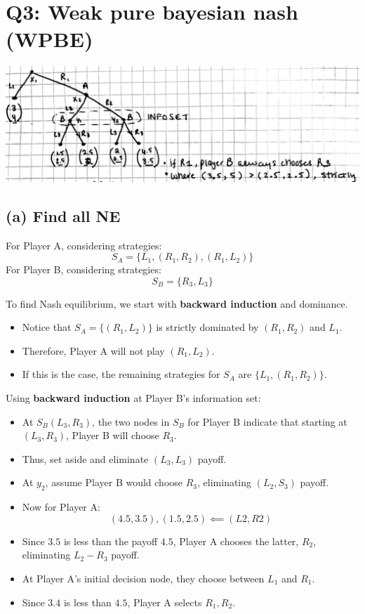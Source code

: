\documentclass{article}
\begin{document}
\section*{Q3: Weak pure bayesian nash (WPBE)}


\begin{center}
 \includegraphics[width=.75\linewidth]{images/Screenshot 2025-03-02 at 19.20.19.png} 
\end{center}


\subsection*{(a) Find all NE}
For Player A, considering strategies:
\[
S_A = \{L_1, (R_1, R_2), (R_1, L_2)\}
\]
For Player B, considering strategies:
\[
S_B = \{R_3, L_3\}
\]

To find Nash equilibrium, we start with \textbf{backward induction} and dominance.

\begin{itemize}
    \item Notice that \( S_A = \{(R_1, L_2)\} \) is strictly dominated by \( (R_1, R_2) \) and \( L_1 \).
    \item Therefore, Player A will not play \( (R_1, L_2) \).
    \item If this is the case, the remaining strategies for \( S_A \) are \( \{L_1, (R_1, R_2)\} \).
\end{itemize}

Using \textbf{backward induction} at Player B's information set:

\begin{itemize}
    \item At \( S_B(L_3, R_3) \), the two nodes in \( S_B \) for Player B indicate that starting at \( (L_3, R_3) \), Player B will choose \( R_3 \).
    \item Thus, set aside and eliminate \( (L_3, L_3) \) payoff.
    \item At \( y_2 \), assume Player B would choose \( R_3 \), eliminating \( (L_2, S_3) \) payoff.
    \item Now for Player A:
    \[
    (4.5, 3.5), (1.5, 2.5) \impliedby (L2, R2)
    \]
    \item Since \( 3.5 \) is less than the payoff \( 4.5 \), Player A chooses the latter, \( R_2 \), eliminating \( L_2 - R_3 \) payoff.
    \item At Player A's initial decision node, they choose between \( L_1 \) and \( R_1 \).
    \item Since \( 3.4 \) is less than \( 4.5 \), Player A selects \( R_1, R_2 \).
\end{itemize}
\end{document}

